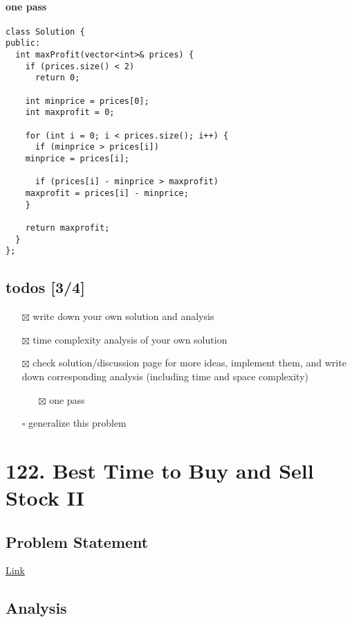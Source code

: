 \documentclass[11pt]{article}
\begin{document}
\paragraph{one pass}
\label{sec:orga59f6ee}
\begin{verbatim}
class Solution {
public:
  int maxProfit(vector<int>& prices) {
    if (prices.size() < 2)
      return 0;

    int minprice = prices[0];
    int maxprofit = 0;

    for (int i = 0; i < prices.size(); i++) {
      if (minprice > prices[i])
	minprice = prices[i];

      if (prices[i] - minprice > maxprofit)
	maxprofit = prices[i] - minprice;
    }

    return maxprofit;
  }
};
\end{verbatim}
\subsection{todos [3/4]}
\label{sec:org3e3b33c}
\begin{itemize}
\item[{$\boxtimes$}] write down your own solution and analysis
\item[{$\boxtimes$}] time complexity analysis of your own solution
\item[{$\boxtimes$}] check solution/discussion page for more ideas, implement them, and write down corresponding analysis (including time and space complexity)
\begin{itemize}
\item[{$\boxtimes$}] one pass
\end{itemize}
\item[{$\square$}] generalize this problem
\end{itemize}
\section{122. Best Time to Buy and Sell Stock II \label{org792889a}}
\label{sec:org76954a5}
\subsection{Problem Statement}
\label{sec:orgc73829b}
\href{https://leetcode.com/problems/best-time-to-buy-and-sell-stock-ii/}{Link}
\subsection{Analysis}
\label{sec:orgb37d451}
\end{document}
